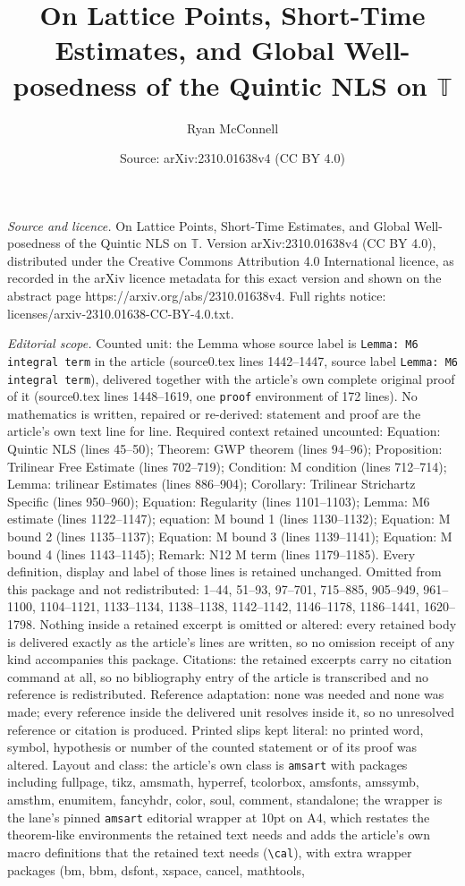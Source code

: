 \documentclass[10pt,a4paper]{amsart}
\title[On Lattice Points, Short-Time Estimates, and Global Well-pos]{On Lattice Points, Short-Time Estimates, and Global Well-posedness of the Quintic NLS on $\mathbb{T}$}
\author{Ryan McConnell}
\date{Source: arXiv:2310.01638v4 (CC BY 4.0)}
\begin{document}
\maketitle

\noindent\emph{Source and licence.} On Lattice Points, Short-Time Estimates, and Global Well-posedness of the Quintic NLS on $\mathbb{T}$. Version arXiv:2310.01638v4 (CC BY 4.0), distributed under the Creative Commons Attribution 4.0 International licence, as recorded in the arXiv licence metadata for this exact version and shown on the abstract page https://arxiv.org/abs/2310.01638v4. Full rights notice: licenses/arxiv-2310.01638-CC-BY-4.0.txt.\par\smallskip

\noindent\textit{Editorial scope.} Counted unit: the Lemma whose source label is \texttt{Lemma: M6 integral term} in the article (source0.tex lines 1442--1447, source label \texttt{Lemma: M6 integral term}), delivered together with the article's own complete original proof of it (source0.tex lines 1448--1619, one \texttt{proof} environment of 172 lines). No mathematics is written, repaired or re-derived: statement and proof are the article's own text line for line. Required context retained uncounted: Equation: Quintic NLS (lines 45--50); Theorem: GWP theorem (lines 94--96); Proposition: Trilinear Free Estimate (lines 702--719); Condition: M condition (lines 712--714); Lemma: trilinear Estimates (lines 886--904); Corollary: Trilinear Strichartz Specific (lines 950--960); Equation: Regularity (lines 1101--1103); Lemma: M6 estimate (lines 1122--1147); equation: M bound 1 (lines 1130--1132); Equation: M bound 2 (lines 1135--1137); Equation: M bound 3 (lines 1139--1141); Equation: M bound 4 (lines 1143--1145); Remark: N12 M term (lines 1179--1185). Every definition, display and label of those lines is retained unchanged. Omitted from this package and not redistributed: 1--44, 51--93, 97--701, 715--885, 905--949, 961--1100, 1104--1121, 1133--1134, 1138--1138, 1142--1142, 1146--1178, 1186--1441, 1620--1798. Nothing inside a retained excerpt is omitted or altered: every retained body is delivered exactly as the article's lines are written, so no omission receipt of any kind accompanies this package. Citations: the retained excerpts carry no citation command at all, so no bibliography entry of the article is transcribed and no reference is redistributed. Reference adaptation: none was needed and none was made; every reference inside the delivered unit resolves inside it, so no unresolved reference or citation is produced. Printed slips kept literal: no printed word, symbol, hypothesis or number of the counted statement or of its proof was altered. Layout and class: the article's own class is \texttt{amsart} with packages including fullpage, tikz, amsmath, hyperref, tcolorbox, amsfonts, amssymb, amsthm, enumitem, fancyhdr, color, soul, comment, standalone; the wrapper is the lane's pinned \texttt{amsart} editorial wrapper at 10pt on A4, which restates the theorem-like environments the retained text needs and adds the article's own macro definitions that the retained text needs (\texttt{\textbackslash cal}), with extra wrapper packages (bm, bbm, dsfont, xspace, cancel, mathtools, 
\end{document}
